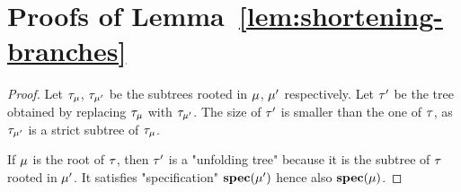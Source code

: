 \section{Proofs of Lemma~\ref{lem:shortening-branches}}
\label{app:proofs-reduction-branches}

\lemShorteningBranches*

\begin{proof}
	Let $\tau_{\mu}$, $\tau_{\mu'}$ be the subtrees rooted in $\mu$, $\mu'$ respectively. 
	Let $\tau'$ be the tree obtained by replacing $\tau_{\mu}$ with $\tau_{\mu'}$. The size of $\tau'$ is smaller than the one of $\tau$, as $\tau_{\mu'}$ is a strict subtree of $\tau_{\mu}$.
	
	If $\mu$ is the root of $\tau$, then $\tau'$ is a "unfolding tree" because it is the subtree of $\tau$ rooted in $\mu'$. It satisfies "specification" $\mathbf{spec}(\mu')$ hence also $\mathbf{spec}(\mu)$. 
	



	

\end{proof}
